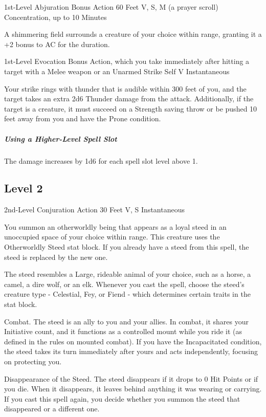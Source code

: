 \documentclass[letterpaper,openany,oneside,twocolumn]{book}
\begin{document}
	{1st-Level Abjuration}
	{Bonus Action}
	{60 Feet}
	{V, S, M (a prayer scroll)}
	{Concentration, up to 10 Minutes}

A shimmering field surrounds a creature of your choice within range, granting it a +2 bonus to AC for the duration.

	{1st-Level Evocation}
	{Bonus Action, which you take immediately after hitting a target with a Melee weapon or an Unarmed Strike}
	{Self}
	{V}
	{Instantaneous}

Your strike rings with thunder that is audible within 300 feet of you, and the target takes an extra 2d6 Thunder damage from the attack. Additionally, if the target is a creature, it must succeed on a Strength saving throw or be pushed 10 feet away from you and have the Prone condition.

\subparagraph*{Using a Higher-Level Spell Slot} The damage increases by 1d6 for each spell slot level above 1.

\subsection*{Level 2}
	{2nd-Level Conjuration}
	{Action}
	{30 Feet}
	{V, S}
	{Instantaneous}

You summon an otherworldly being that appears as a loyal steed in an unoccupied space of your choice within range. This creature uses the Otherworldly Steed stat block. If you already have a steed from this spell, the steed is replaced by the new one.

The steed resembles a Large, rideable animal of your choice, such as a horse, a camel, a dire wolf, or an elk. Whenever you cast the spell, choose the steed's creature type - Celestial, Fey, or Fiend - which determines certain traits in the stat block.

Combat. The steed is an ally to you and your allies. In combat, it shares your Initiative count, and it functions as a controlled mount while you ride it (as defined in the rules on mounted combat). If you have the Incapacitated condition, the steed takes its turn immediately after yours and acts independently, focusing on protecting you.

Disappearance of the Steed. The steed disappears if it drops to 0 Hit Points or if you die. When it disappears, it leaves behind anything it was wearing or carrying. If you cast this spell again, you decide whether you summon the steed that disappeared or a different one.
\end{document}
